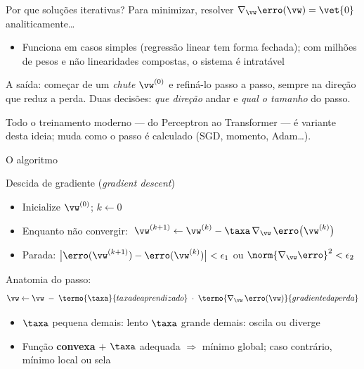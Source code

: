 \documentclass[aspectratio=169, 11pt]{beamer}
\begin{document}
\begin{frame}{Por que soluções iterativas?}
  Para minimizar, resolver $\nabla_{\vw} \erro(\vw) = \vet{0}$ analiticamente\dots

  \begin{itemize}\setlength{\itemsep}{0.2ex}
    \item Funciona em casos simples (regressão linear tem forma fechada);
          com milhões de pesos e não linearidades compostas, o sistema é
          \alert{intratável}
  \end{itemize}

  \begin{ideiabox}
    A saída: começar de um \emph{chute} $\vw^{(0)}$ e refiná-lo passo a passo,
    sempre na direção que reduz a perda. Duas decisões: \emph{que direção}
    andar e \emph{qual o tamanho} do passo.
  \end{ideiabox}

  \begin{alertabox}
    Todo o treinamento moderno — do Perceptron ao Transformer — é variante
    desta ideia; muda como o passo é calculado (SGD, momento, Adam\dots).
  \end{alertabox}
\end{frame}

\begin{frame}{O algoritmo}
  \begin{algbox}{Descida de gradiente (\emph{gradient descent})}
    \begin{itemize}\setlength{\itemsep}{0.2ex}
      \item Inicialize $\vw^{(0)}$; $k \leftarrow 0$
      \item Enquanto não convergir:
            \(\;\vw^{(k+1)} \leftarrow \vw^{(k)} - \taxa\, \nabla_{\vw}\, \erro\big(\vw^{(k)}\big)\)
      \item Parada:
            \(\big|\erro(\vw^{(k+1)}) - \erro(\vw^{(k)})\big| < \epsilon_1\)
            \;ou\; \(\norm{\nabla_{\vw} \erro}^2 < \epsilon_2\)
    \end{itemize}
  \end{algbox}

  Anatomia do passo:
  \[
    \vw \leftarrow \vw
      \;-\; \termo{\taxa}{taxa de aprendizado}
      \;\cdot\; \termo{\nabla_{\vw}\, \erro(\vw)}{gradiente da perda}
  \]

  \begin{itemize}\setlength{\itemsep}{0.2ex}
    \item $\taxa$ pequena demais: lento \quad\textbullet\quad
          $\taxa$ grande demais: oscila ou diverge
    \item Função \textbf{convexa} $+$ $\taxa$ adequada $\Rightarrow$ mínimo
          \alert{global}; caso contrário, mínimo local ou sela
  \end{itemize}
\end{frame}
\end{document}
